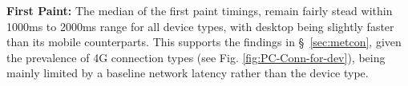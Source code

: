 


\noindent\textbf{First Paint:}
The median of the first paint timings, %
remain fairly stead within 1000ms to 2000ms range for all device types, with desktop being slightly faster than its mobile counterparts. This supports the findings in §~\ref{sec:metcon}, given the prevalence of 4G connection types (see Fig. \ref{fig:PC-Conn-for-dev}), being mainly limited by a baseline network latency \cite{DBLP:journals/comsur/BriscoeBPHRTGFG16} %
rather than the device type. 


